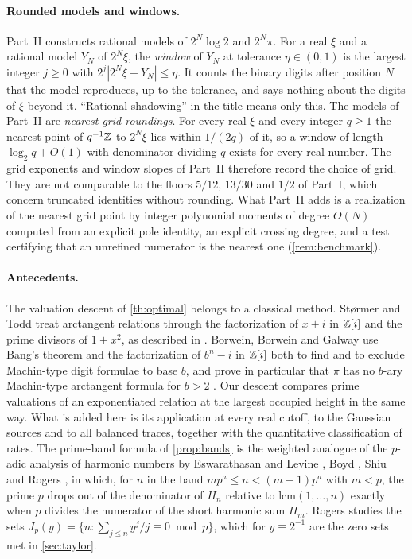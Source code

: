 \documentclass[11pt]{article}
\begin{document}
\paragraph{Rounded models and windows.} Part~II constructs rational models of $2^N\log 2$ and $2^N\pi$. For a real $\xi$ and a rational model $Y_N$ of $2^N\xi$, the \emph{window} of $Y_N$ at tolerance $\eta\in(0,1)$ is the largest integer $j\ge0$ with $2^j|2^N\xi-Y_N|\le\eta$. It counts the binary digits after position $N$ that the model reproduces, up to the tolerance, and says nothing about the digits of $\xi$ beyond it. ``Rational shadowing'' in the title means only this. The models of Part~II are \emph{nearest-grid roundings}. For every real $\xi$ and every integer $q\ge1$ the nearest point of $q^{-1}\mathbb Z$ to $2^N\xi$ lies within $1/(2q)$ of it, so a window of length $\log_2 q+O(1)$ with denominator dividing $q$ exists for every real number. The grid exponents and window slopes of Part~II therefore record the choice of grid. They are not comparable to the floors $5/12$, $13/30$ and $1/2$ of Part~I, which concern truncated identities without rounding. What Part~II adds is a realization of the nearest grid point by integer polynomial moments of degree $O(N)$ computed from an explicit pole identity, an explicit crossing degree, and a test certifying that an unrefined numerator is the nearest one (\cref{rem:benchmark}).

\paragraph{Antecedents.} The valuation descent of \cref{th:optimal} belongs to a classical method. St{\o}rmer \cite{storm} and Todd \cite{todd} treat arctangent relations through the factorization of $x+i$ in $\mathbb Z[i]$ and the prime divisors of $1+x^2$, as described in \cite[\S2.1]{bbg}. Borwein, Borwein and Galway \cite{bbg} use Bang's theorem and the factorization of $b^n-i$ in $\mathbb Z[i]$ both to find and to exclude Machin-type digit formulae to base $b$, and prove in particular that $\pi$ has no $b$-ary Machin-type arctangent formula for $b>2$ \cite[Theorem~7, p.~918]{bbg}. Our descent compares prime valuations of an exponentiated relation at the largest occupied height in the same way. What is added here is its application at every real cutoff, to the Gaussian sources and to all balanced traces, together with the quantitative classification of rates. The prime-band formula of \cref{prop:bands} is the weighted analogue of the $p$-adic analysis of harmonic numbers by Eswarathasan and Levine \cite{el}, Boyd \cite{boyd}, Shiu \cite[Theorem~2]{shiu} and Rogers \cite{rogers}, in which, for $n$ in the band $mp^a\le n<(m+1)p^a$ with $m<p$, the prime $p$ drops out of the denominator of $H_n$ relative to $\mathrm{lcm}(1,\dots,n)$ exactly when $p$ divides the numerator of the short harmonic sum $H_m$. Rogers studies the sets $J_p(y)=\{n:\sum_{j\le n}y^j/j\equiv0\bmod p\}$, which for $y\equiv2^{-1}$ are the zero sets met in \cref{sec:taylor}.
\end{document}
